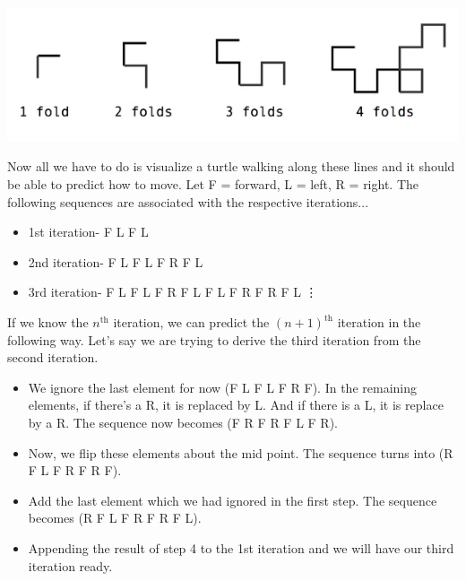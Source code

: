 \documentclass[a4paper,12pt]{article}
\begin{document}
\begin{center}
    \begin{center}
        \includegraphics[scale=0.7]{images/paper folding.png}
    \end{center}
\end{center}

\begin{flushleft}
    Now all we have to do is visualize a turtle walking along these lines and it should be able to predict how to move. Let F = forward, L = left, R = right. The following sequences are associated with the respective iterations...
    
    \begin{itemize}
        \item 1st iteration- F L F L
        \item 2nd iteration- F L F L F R F L
        \item 3rd iteration- F L F L F R F L F L F R F R F L
        \vdots
    \end{itemize}

If we know the $n^{\text{th}}$ iteration, we can predict the $(n+1)^{\text{th}}$ iteration in the following way. Let’s say we are trying to derive the third iteration from the second iteration.

    \begin{itemize}
        \item We ignore the last element for now (F L F L F R F). In the remaining elements, if there’s a R, it is replaced by L. And if there is a L, it is replace by a R. The sequence now becomes (F R F R F L F R).
        \item Now, we flip these elements about the mid point. The sequence turns into (R F L F R F R F).
        \item Add the last element which we had ignored in the first step. The sequence becomes (R F L F R F R F L).
        \item Appending the result of step 4 to the 1st iteration and we will have our third iteration ready.
    \end{itemize}


\end{flushleft}
\end{document}
